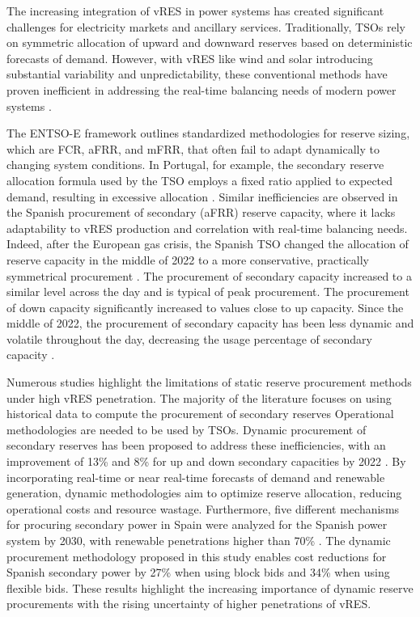 The increasing integration of \gls{vRES} in power systems has created significant challenges for electricity markets and ancillary services. Traditionally, \gls{TSO}s rely on symmetric allocation of upward and downward reserves based on deterministic forecasts of demand. However, with \gls{vRES} like wind and solar introducing substantial variability and unpredictability, these conventional methods have proven inefficient in addressing the real-time balancing needs of modern power systems \cite{Ocker2017,Frade2019_wind,Prema:22}.\par
The \gls{ENTSO-E} framework \cite{handbook2009policy} outlines standardized methodologies for reserve sizing, which are \gls{FCR}, \gls{aFRR}, and \gls{mFRR}, that often fail to adapt dynamically to changing system conditions. In Portugal, for example, the secondary reserve allocation formula used by the \gls{TSO} employs a fixed ratio applied to expected demand, resulting in excessive allocation \cite{Frade:19c,Perissi2022}. Similar inefficiencies are observed in the Spanish procurement of secondary (\gls{aFRR}) reserve capacity, where it lacks adaptability to \gls{vRES} production and correlation with real-time balancing needs\cite{Algarvio:24,Cardo-Miota:23}.
%
{Indeed, after the European gas crisis, the Spanish TSO changed the allocation of reserve capacity in the middle of 2022 to a more conservative, practically symmetrical procurement \cite{Grubb:22,Cardo-Miota:23}. The procurement of secondary capacity increased to a similar level across the day and is typical of peak procurement. The procurement of down capacity significantly increased to values close to up capacity. Since the middle of 2022, the procurement of secondary capacity has been less dynamic and volatile throughout the day, decreasing the usage percentage of secondary capacity \cite{Algarvio:24,Cardo-Miota:23}.}
%

Numerous studies highlight the limitations of static reserve procurement methods under high vRES penetration.
%
The majority of the literature focuses on using historical data to compute the procurement of secondary reserves \cite{Knorr:19,Frade2019_market,Papavasiliou:21}
%
Operational methodologies are needed to be used by TSOs.
%
Dynamic procurement of secondary reserves has been proposed to address these inefficiencies, with an improvement of 13\% and 8\% for up and down secondary capacities by 2022 \cite{Algarvio2024}. By incorporating real-time or near real-time forecasts of demand and renewable generation, dynamic methodologies aim to optimize reserve allocation, reducing operational costs and resource wastage.
%
Furthermore, five different mechanisms for procuring secondary power in Spain were analyzed for the Spanish power system by 2030, with renewable penetrations higher than 70\% \cite{Algarvio:24}. The dynamic procurement methodology proposed in this study enables cost reductions for Spanish secondary power by 27\% when using block bids and 34\% when using flexible bids. These results highlight the increasing importance of dynamic reserve procurements with the rising uncertainty of higher penetrations of \gls{vRES}.  

